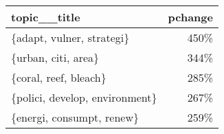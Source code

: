 \begin{tabular}{p{2cm}r}
\toprule
                   topic\_\_title &  pchange \\
\midrule
      \{adapt, vulner, strategi\} &     450\% \\
            \{urban, citi, area\} &     344\% \\
          \{coral, reef, bleach\} &     285\% \\
 \{polici, develop, environment\} &     267\% \\
      \{energi, consumpt, renew\} &     259\% \\
\bottomrule
\end{tabular}
